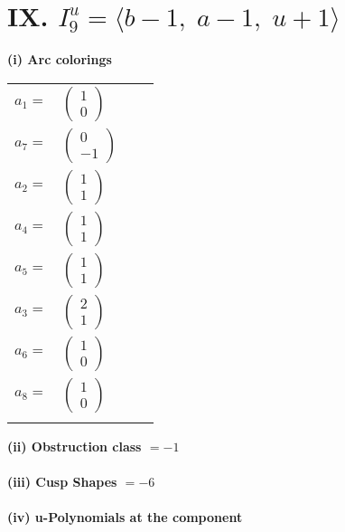 \documentclass[1p]{elsarticle_modified}
\theoremstyle{definition}
\begin{document}
\centering \section*{IX. $I^u_{9}= \langle b-1,\;a-1,\;u+1 \rangle$}
\flushleft \textbf{(i) Arc colorings}\\
\begin{tabular}{m{7pt} m{180pt} m{7pt} m{180pt} }
\flushright $a_{1}=$&$\begin{pmatrix}1\\0\end{pmatrix}$ \\
\flushright $a_{7}=$&$\begin{pmatrix}0\\-1\end{pmatrix}$ \\
\flushright $a_{2}=$&$\begin{pmatrix}1\\1\end{pmatrix}$ \\
\flushright $a_{4}=$&$\begin{pmatrix}1\\1\end{pmatrix}$ \\
\flushright $a_{5}=$&$\begin{pmatrix}1\\1\end{pmatrix}$ \\
\flushright $a_{3}=$&$\begin{pmatrix}2\\1\end{pmatrix}$ \\
\flushright $a_{6}=$&$\begin{pmatrix}1\\0\end{pmatrix}$ \\
\flushright $a_{8}=$&$\begin{pmatrix}1\\0\end{pmatrix}$\\&\end{tabular}
\flushleft \textbf{(ii) Obstruction class $= -1$}\\~\\
\flushleft \textbf{(iii) Cusp Shapes $= -6$}\\~\\
\newpage\renewcommand{\arraystretch}{1}
\flushleft \textbf{(iv) u-Polynomials at the component}\newline \\
\end{document}
